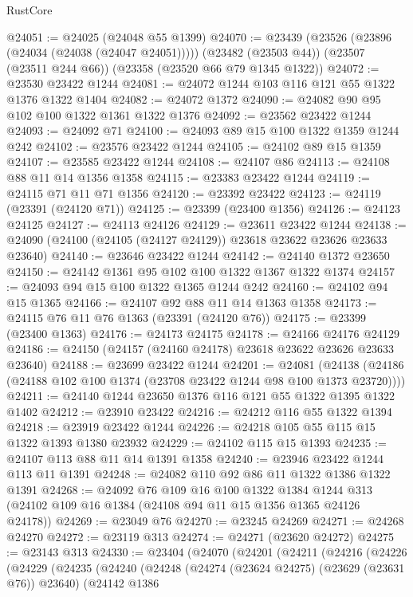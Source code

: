\begin{lexlean}{RustCore}
\begin{coremodule}
@24051 := @24025 (@24048 @55 @1399)
@24070 := @23439
    (@23526 (@23896 (@24034 (@24038 (@24047 @24051)))))
    (@23482 (@23503 @44))
    (@23507 (@23511 @244 @66))
    (@23358 (@23520 @66 @79 @1345 @1322))
@24072 := @23530 @23422 @1244
@24081 := @24072 @1244 @103 @116 @121 @55 @1322 @1376 @1322 @1404
@24082 := @24072 @1372
@24090 := @24082 @90 @95 @102 @100 @1322 @1361 @1322 @1376
@24092 := @23562 @23422 @1244
@24093 := @24092 @71
@24100 := @24093 @89 @15 @100 @1322 @1359 @1244 @242
@24102 := @23576 @23422 @1244
@24105 := @24102 @89 @15 @1359
@24107 := @23585 @23422 @1244
@24108 := @24107 @86
@24113 := @24108 @88 @11 @14 @1356 @1358
@24115 := @23383 @23422 @1244
@24119 := @24115 @71 @11 @71 @1356
@24120 := @23392 @23422
@24123 := @24119 (@23391 (@24120 @71))
@24125 := @23399 (@23400 @1356)
@24126 := @24123 @24125
@24127 := @24113 @24126
@24129 := @23611 @23422 @1244
@24138 := @24090 (@24100 (@24105 (@24127 @24129)) @23618 @23622 @23626 @23633 @23640)
@24140 := @23646 @23422 @1244
@24142 := @24140 @1372 @23650
@24150 := @24142 @1361 @95 @102 @100 @1322 @1367 @1322 @1374
@24157 := @24093 @94 @15 @100 @1322 @1365 @1244 @242
@24160 := @24102 @94 @15 @1365
@24166 := @24107 @92 @88 @11 @14 @1363 @1358
@24173 := @24115 @76 @11 @76 @1363 (@23391 (@24120 @76))
@24175 := @23399 (@23400 @1363)
@24176 := @24173 @24175
@24178 := @24166 @24176 @24129
@24186 := @24150 (@24157 (@24160 @24178) @23618 @23622 @23626 @23633 @23640)
@24188 := @23699 @23422 @1244
@24201 := @24081
    (@24138 (@24186 (@24188 @102 @100 @1374 (@23708 @23422 @1244 @98 @100 @1373 @23720))))
@24211 := @24140 @1244 @23650 @1376 @116 @121 @55 @1322 @1395 @1322 @1402
@24212 := @23910 @23422
@24216 := @24212 @116 @55 @1322 @1394
@24218 := @23919 @23422 @1244
@24226 := @24218 @105 @55 @115 @15 @1322 @1393 @1380 @23932
@24229 := @24102 @115 @15 @1393
@24235 := @24107 @113 @88 @11 @14 @1391 @1358
@24240 := @23946 @23422 @1244 @113 @11 @1391
@24248 := @24082 @110 @92 @86 @11 @1322 @1386 @1322 @1391
@24268 := @24092
    @76
    @109
    @16
    @100
    @1322
    @1384
    @1244
    @313
    (@24102 @109 @16 @1384 (@24108 @94 @11 @15 @1356 @1365 @24126 @24178))
@24269 := @23049 @76
@24270 := @23245 @24269
@24271 := @24268 @24270
@24272 := @23119 @313
@24274 := @24271 (@23620 @24272)
@24275 := @23143 @313
@24330 := @23404
    (@24070
      (@24201
        (@24211
          (@24216
            (@24226
              (@24229
                (@24235
                  (@24240
                    (@24248
                      (@24274 (@23624 @24275) (@23629 (@23631 @76)) @23640)
                      (@24142
                        @1386

\end{coremodule}
\end{lexlean}
